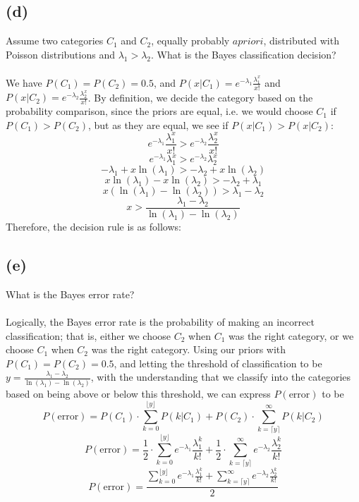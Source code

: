 \documentclass{article}
\begin{document}
{\subsection*{(d)}
Assume two categories \(C_1\) and \(C_2\), equally probably \(a priori\), distributed with Poisson distributions and \(\lambda_1 > \lambda_2\). What is the Bayes classification decision? \\ \\
We have \(P(C_1) = P(C_2) = 0.5\), and \(P(x | C_1) = e^{-\lambda_1} \frac{\lambda_1^x}{x!}\) and \(P(x | C_2) = e^{-\lambda_2} \frac{\lambda_2^x}{x!}\). By definition, we decide the category based on the probability comparison, since the priors are equal, i.e. we would choose \(C_1\) if \(P(C_1) > P(C_2)\), but as they are equal, we see if \(P(x | C_1) > P(x | C_2)\): 
\[
  e^{-\lambda_1} \frac{\lambda_1^x}{x!} > e^{-\lambda_2} \frac{\lambda_2^x}{x!}
\]
\[
  e^{-\lambda_1} \lambda_1^x > e^{-\lambda_2} \lambda_2^x
\]
\[
  -\lambda_1 + x \ln(\lambda_1) > -\lambda_2 + x \ln(\lambda_2)
\]
\[
  x \ln(\lambda_1) - x \ln(\lambda_2) > -\lambda_2 + \lambda_1
\]
\[
  x (\ln(\lambda_1) - \ln(\lambda_2)) > \lambda_1 - \lambda_2
\]
\[
  x > \frac{\lambda_1 - \lambda_2}{\ln(\lambda_1) - \ln(\lambda_2)}
\]
Therefore, the decision rule is as follows: \\

\subsection*{(e)}
What is the Bayes error rate? \\ \\
Logically, the Bayes error rate is the probability of making an incorrect classification; that is, either we choose \(C_2\) when \(C_1\) was the right category, or we choose \(C_1\) when \(C_2\) was the right category. Using our priors with \(P(C_1) = P(C_2) = 0.5\), and letting the threshold of classification to be \(y = \frac{\lambda_1 - \lambda_2}{\ln(\lambda_1) - \ln(\lambda_2)}\), with the understanding that we classify into the categories based on being above or below this threshold, we can express \(P(\text{error})\) to be 
\[
  P(\text{error}) = P(C_1) \cdot \sum_{k=0}^{\lfloor y \rfloor} P(k | C_1) + P(C_2) \cdot \sum_{k = \lceil y \rceil}^{\infty} P(k | C_2)
\]
\[
  P(\text{error}) = \frac{1}{2} \cdot \sum_{k=0}^{\lfloor y \rfloor} e^{-\lambda_1} \frac{\lambda_1^k}{k!} + \frac{1}{2} \cdot \sum_{k = \lceil y \rceil}^{\infty} e^{-\lambda_2} \frac{\lambda_2^k}{k!}
\]
\[
  \boxed{
    P(\text{error}) = \frac{\sum_{k=0}^{\lfloor y \rfloor} e^{-\lambda_1} \frac{\lambda_1^k}{k!} + \sum_{k = \lceil y \rceil}^{\infty} e^{-\lambda_2} \frac{\lambda_2^k}{k!}}{2}
  }
\]

}
\end{document}

